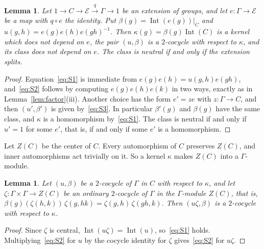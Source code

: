 \documentclass[12pt,letterpaper]{article}
\numberwithin{equation}{section}
\theoremstyle{plain}
\newtheorem{lemma}[theorem]{Lemma}
\theoremstyle{definition}
\DeclareMathOperator{\Int}{Int}
\begin{document}
\begin{lemma}\label{lem:ext-class}
Let $1\to C\to\mathcal{E}\overset{q}{\to}\Gamma\to1$ be an extension of
groups, and let $e:\Gamma\to\mathcal{E}$ be a map with $q\circ e$ the
identity. Put $\beta(g)=\Int(e(g))|_C$ and $u(g,h)=e(g)e(h)e(gh)^{-1}$.
Then $\kappa(g)=\beta(g)\Int(C)$ is a kernel which does not depend on $e$,
the pair $(u,\beta)$ is a $2$-cocycle with respect to $\kappa$, and its
class does not depend on $e$. The class is neutral if and only if the
extension splits.
\end{lemma}

\begin{proof}
Equation~\eqref{eq:S1} is immediate from $e(g)e(h)=u(g,h)e(gh)$,
and~\eqref{eq:S2} follows by computing $e(g)e(h)e(k)$ in two ways, exactly
as in Lemma~\ref{lem:factor}(iii). Another choice has the form $e'=ze$
with $z:\Gamma\to C$, and then $(u',\beta')$ is given by~\eqref{eq:S3}. In
particular $\beta'(g)$ and $\beta(g)$ have the same class, and $\kappa$ is
a homomorphism by~\eqref{eq:S1}. The class is neutral if and only if
$u'=1$ for some $e'$, that is, if and only if some $e'$ is a homomorphism.
\end{proof}

Let $Z(C)$ be the center of $C$. Every automorphism of $C$ preserves
$Z(C)$, and inner automorphisms act trivially on it. So a kernel $\kappa$
makes $Z(C)$ into a $\Gamma$-module.

\begin{lemma}\label{lem:twist}
Let $(u,\beta)$ be a $2$-cocycle of $\Gamma$ in $C$ with respect to
$\kappa$, and let $\zeta:\Gamma\times\Gamma\to Z(C)$ be an ordinary
$2$-cocycle of $\Gamma$ in the $\Gamma$-module $Z(C)$, that is,
$\beta(g)(\zeta(h,k))\,\zeta(g,hk)=\zeta(g,h)\,\zeta(gh,k)$. Then
$(u\zeta,\beta)$ is a $2$-cocycle with respect to $\kappa$.
\end{lemma}

\begin{proof}
Since $\zeta$ is central, $\Int(u\zeta)=\Int(u)$, so~\eqref{eq:S1} holds.
Multiplying~\eqref{eq:S2} for $u$ by the cocycle identity for $\zeta$
gives~\eqref{eq:S2} for $u\zeta$.
\end{proof}
\end{document}
